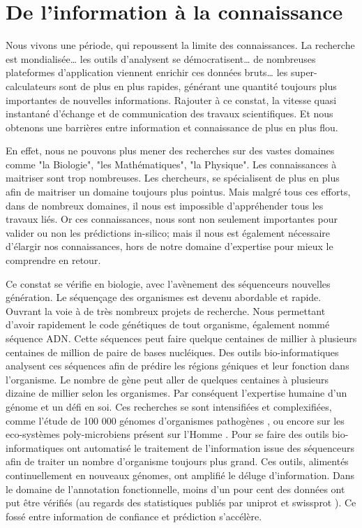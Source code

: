 \chapter{De l'information à la connaissance}
Nous vivons une période, qui repoussent la limite des connaissances. La recherche est mondialisée… les outils d'analysent se démocratisent… de nombreuses plateformes d'application viennent enrichir ces données bruts… les super-calculateurs sont de plus en plus rapides, générant une quantité toujours plus importantes de nouvelles informations. Rajouter à ce constat, la vitesse quasi instantané d'échange et de communication des travaux scientifiques. Et nous obtenons une barrières entre information et connaissance de plus en plus flou.

En effet,  nous ne pouvons plus mener des recherches sur des vastes domaines comme "la Biologie", "les Mathématiques", "la Physique". Les connaissances à maitriser sont trop nombreuses. Les chercheurs, se spécialisent de plus en plus afin de maitriser un domaine toujours plus pointus. Mais malgré tous ces efforts, dans de nombreux domaines, il nous est impossible d'appréhender tous les travaux liés. Or ces connaissances, nous sont non seulement
importantes pour valider ou non les prédictions in-silico; mais il nous est également nécessaire d'élargir nos connaissances, hors de notre domaine d'expertise pour mieux le comprendre en retour.

Ce constat se vérifie en biologie, avec l'avènement des séquenceurs nouvelles génération. Le séquençage des organismes est devenu abordable et rapide. Ouvrant la voie à de très nombreux projets de recherche. Nous permettant d'avoir rapidement le code génétiques de tout organisme, également nommé séquence \gls{ADN}. Cette séquences peut faire quelque centaines de millier à plusieurs centaines de million de paire de bases nucléiques. Des outils bio-informatiques analysent ces séquences afin de prédire les régions géniques et leur fonction dans l'organisme. Le nombre de gène peut aller de quelques centaines à plusieurs dizaine de millier selon les organismes. Par conséquent l'expertise humaine d'un génome et un défi en soi. Ces recherches se sont intensifiées et complexifiées, comme l'étude de 100 000 génomes d'organismes pathogènes \cite{100kfoodborne}, ou encore sur les eco-systèmes poly-microbiens présent sur l'Homme \cite{hmp}. Pour se faire des outils bio-informatiques ont automatisé le traitement de l'information issue des séquenceurs afin de traiter un nombre d'organisme toujours plus grand. Ces outils, alimentés continuellement en nouveaux génomes, ont amplifié le déluge d'information. Dans le domaine de l'annotation fonctionnelle, moins d'un pour cent des données ont put être vérifiés (au regards des statistiques publiés par uniprot et swissprot \parencites{uniprot_stat}{expasy_stat} ). Ce fossé entre information de confiance et prédiction s'accélère.

